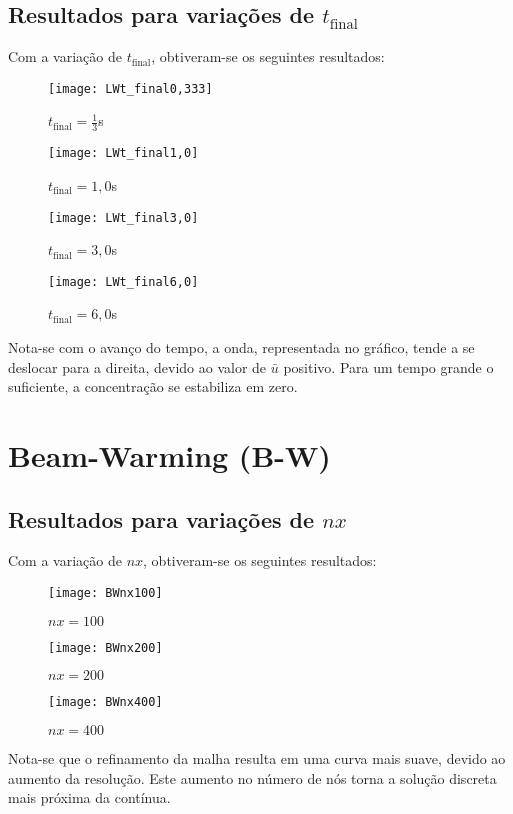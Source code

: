 \subsection{Resultados para variações de $t_{\text{final}}$}
Com a variação de $t_{\text{final}}$, obtiveram-se os seguintes resultados:
\begin{figure}[H]
    \centering
    \texttt{[image: LWt\_final0,333]}
    \caption{$t_{\text{final}} = \frac{1}{3}$s}
\end{figure}
\begin{figure}[H]
    \centering
    \texttt{[image: LWt\_final1,0]}
    \caption{$t_{\text{final}} = 1,0$s}
\end{figure}
\begin{figure}[H]
    \centering
    \texttt{[image: LWt\_final3,0]}
    \caption{$t_{\text{final}} = 3,0$s}
\end{figure}
\begin{figure}[H]
    \centering
    \texttt{[image: LWt\_final6,0]}
    \caption{$t_{\text{final}} = 6,0$s}
\end{figure}
Nota-se com o avanço do tempo, a onda, representada no gráfico, tende a se
deslocar para a direita, devido ao valor de $\bar{u}$ positivo. Para um tempo
grande o suficiente, a concentração se estabiliza em zero.

\section{Beam-Warming (B-W)}

\subsection{Resultados para variações de $nx$}
Com a variação de $nx$, obtiveram-se os seguintes resultados:
\begin{figure}[H]
    \centering
    \texttt{[image: BWnx100]}
    \caption{$nx = 100$}
\end{figure}
\begin{figure}[H]
    \centering
    \texttt{[image: BWnx200]}
    \caption{$nx = 200$}
\end{figure}
\begin{figure}[H]
    \centering
    \texttt{[image: BWnx400]}
    \caption{$nx = 400$}
\end{figure}
Nota-se que o refinamento da malha resulta em uma curva mais suave, devido ao
aumento da resolução. Este aumento no número de nós torna a solução discreta
mais próxima da contínua.

